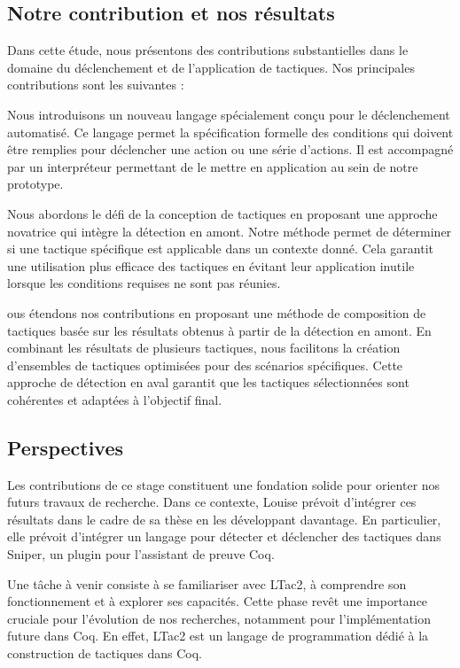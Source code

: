 \documentclass[titlepage]{article}
\begin{document}
\subsection{Notre contribution et nos résultats}
Dans cette étude, nous présentons des contributions substantielles dans le domaine du déclenchement et de l'application de tactiques. Nos principales contributions sont les suivantes :

Nous introduisons un nouveau langage spécialement conçu pour le déclenchement automatisé. Ce langage permet la spécification formelle des conditions qui doivent être remplies pour déclencher une action ou une série d'actions. Il est accompagné par un interpréteur permettant de le mettre en application au sein de notre prototype.

Nous abordons le défi de la conception de tactiques en proposant une approche novatrice qui intègre la détection en amont. Notre méthode permet de déterminer si une tactique spécifique est applicable dans un contexte donné. Cela garantit une utilisation plus efficace des tactiques en évitant leur application inutile lorsque les conditions requises ne sont pas réunies.

ous étendons nos contributions en proposant une méthode de composition de tactiques basée sur les résultats obtenus à partir de la détection en amont. En combinant les résultats de plusieurs tactiques, nous facilitons la création d'ensembles de tactiques optimisées pour des scénarios spécifiques. Cette approche de détection en aval garantit que les tactiques sélectionnées sont cohérentes et adaptées à l'objectif final.

\subsection{Perspectives}
Les contributions de ce stage constituent une fondation solide pour orienter nos futurs travaux de recherche. Dans ce contexte, Louise prévoit d'intégrer ces résultats dans le cadre de sa thèse en les développant davantage. En particulier, elle prévoit d'intégrer un langage pour détecter et déclencher des tactiques dans Sniper, un plugin pour l'assistant de preuve Coq.

Une tâche à venir consiste à se familiariser avec LTac2, à comprendre son fonctionnement et à explorer ses capacités. Cette phase revêt une importance cruciale pour l'évolution de nos recherches, notamment pour l'implémentation future dans Coq. En effet, LTac2 est un langage de programmation dédié à la construction de tactiques dans Coq.
\end{document}
